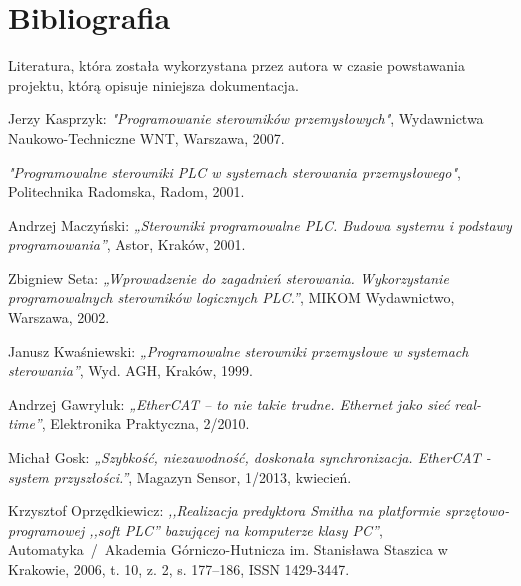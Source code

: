 \section{Bibliografia}
Literatura, która została wykorzystana przez autora w czasie powstawania projektu, którą opisuje niniejsza dokumentacja.

\begin{thebibliography}{99}
Jerzy Kasprzyk: 
\emph{"Programowanie sterowników przemysłowych"},
Wydawnictwa Naukowo-Techniczne WNT, 
Warszawa, 
2007.      

\emph{"Programowalne sterowniki PLC w systemach sterowania przemysłowego"}, 
Politechnika Radomska, 
Radom,
2001.

Andrzej Maczyński:
\emph{„Sterowniki programowalne PLC. Budowa systemu i podstawy programowania”},
Astor, 
Kraków,
2001. 

Zbigniew Seta: 
\emph{„Wprowadzenie do zagadnień sterowania. Wykorzystanie programowalnych sterowników logicznych PLC.”},
MIKOM Wydawnictwo, 
Warszawa,
2002. 

Janusz Kwaśniewski: 
\emph{„Programowalne sterowniki przemysłowe w systemach sterowania”}, 
Wyd. AGH, 
Kraków,
1999.

%
%
%

Andrzej Gawryluk:
\emph{„EtherCAT – to nie takie trudne. Ethernet jako sieć real-time”},
Elektronika Praktyczna, 2/2010.

Michał Gosk:
\emph{„Szybkość, niezawodność, doskonała synchronizacja. EtherCAT - system przyszłości.”},
Magazyn Sensor, 1/2013, kwiecień.

Krzysztof Oprzędkiewicz:
\emph{,,Realizacja predyktora Smitha na platformie sprzętowo-programowej ,,soft PLC'' bazującej na komputerze klasy PC''},
Automatyka~/~Akademia Górniczo-Hutnicza im. Stanisława Staszica w Krakowie,
2006,
t. 10, z. 2, s. 177--186,
ISSN 1429-3447.


\end{thebibliography}
